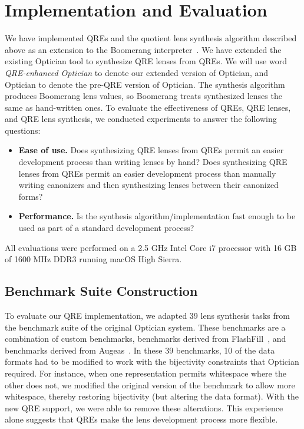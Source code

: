 \documentclass[acmsmall,review,anonymous]{acmart}
\newcommand{\QOpt}{QRE-enhanced Optician}
\begin{document}
\section{Implementation and Evaluation}
\label{impl}

We have implemented QREs and the quotient lens synthesis algorithm described
above as an extension to the Boomerang
interpreter~\cite{boomerang,quotientlenses}. We have extended the existing
Optician tool to synthesize QRE lenses from QREs. We will use word
\emph{\QOpt} to denote our extended version of Optician, and Optician to denote
the pre-QRE version of Optician. The synthesis algorithm produces Boomerang lens
values, so Boomerang treats synthesized lenses the same as hand-written ones. To
evaluate the effectiveness of QREs, QRE lenses, and QRE lens synthesis, we
conducted experiments to answer the following questions:
%
\begin{itemize}
  \item {\bf Ease of use.} Does synthesizing QRE lenses from QREs permit an
  easier development process than writing lenses by hand?
  Does synthesizing QRE lenses from QREs permit an easier development
  process than manually writing canonizers and then synthesizing lenses between
  their canonized forms?  
  \item {\bf Performance.} Is the synthesis algorithm/implementation fast enough to be
  used as part of a standard development process?
\end{itemize}
%
All evaluations were performed on a 2.5 GHz Intel Core i7 processor with 16 GB
of 1600 MHz DDR3 running macOS High Sierra.


\subsection{Benchmark Suite Construction}

To evaluate our QRE implementation, we adapted 39 lens synthesis tasks
from the benchmark suite of the original Optician system. These
benchmarks are a combination of custom benchmarks, benchmarks derived
from FlashFill~\cite{flashfill}, and benchmarks derived from
Augeas~\cite{augeas2}.  In these 39 benchmarks, 10 of
the data formats had to be modified to work with the bijectivity
constraints that Optician required. For instance, when one
representation permits whitespace where the other does not, we
modified the original version of the benchmark to allow more whitespace,
thereby restoring bijectivity (but altering the data format). With the
new QRE support, we were able to remove these alterations.  This
experience alone suggests that QREs make the lens development process
more flexible.
\end{document}
